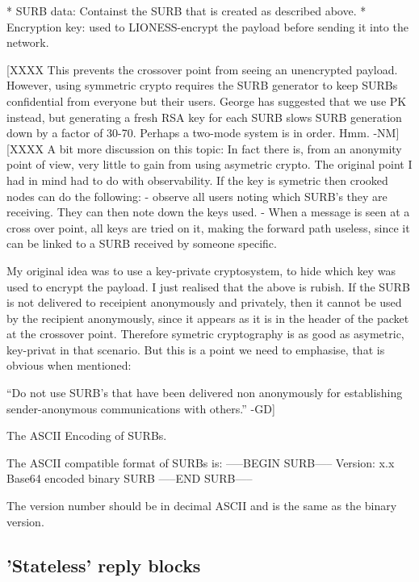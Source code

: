 * SURB data: Containst the SURB that is created as described
  above. 
* Encryption key: used to LIONESS-encrypt the payload before sending it
  into the network.  

  [XXXX This prevents the crossover point from seeing an
    unencrypted payload.  However, using symmetric crypto requires the
    SURB generator to keep SURBs confidential from everyone but their
    users.  George has suggested that we use PK instead, but generating
    a fresh RSA key for each SURB slows SURB generation down by a factor
    of 30-70.   Perhaps a two-mode system is in order.  Hmm. -NM]
  [XXXX A bit more discussion on this topic: In fact there is, from an
    anonymity point of view, very little to gain from using asymetric
    crypto. The original point I had in mind had to do with
    observability. If the key is symetric then crooked nodes can do
    the following:
	- observe all users noting which SURB's they are receiving.
	  They can then note down the keys used.
	- When a message is seen at a cross over point, all keys are
    	  tried on it, making the forward path useless, since it can
          be linked to a SURB received by someone specific.

    My original idea was to use a key-private cryptosystem, to hide
    which key was used to encrypt the payload.
    I just realised that the above is rubish. If the SURB is not
    delivered to receipient anonymously and privately, then it cannot
    be used by the recipient anonymously, since it appears as it is in
    the header of the packet at the crossover point. Therefore
    symetric cryptography is as good as asymetric, key-privat in that
    scenario. But this is a point we need to emphasise, that is
    obvious when mentioned:

	``Do not use SURB's that have been delivered non anonymously
	for establishing sender-anonymous communications with others.''
								-GD]

The ASCII Encoding of SURBs.

The  ASCII compatible format of SURBs is:
-----BEGIN SURB-----
Version: x.x
Base64 encoded binary SURB 
-----END SURB-----

The version number should be in decimal ASCII and is the same as the
binary version.

\subsection{'Stateless' reply blocks}


